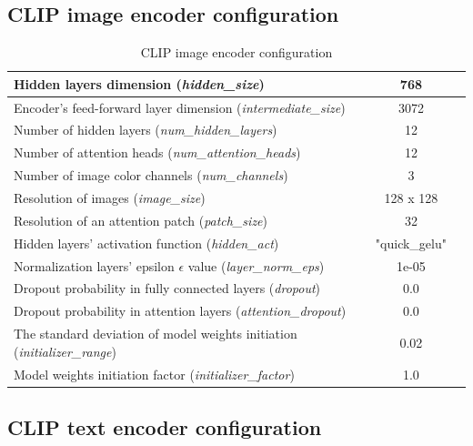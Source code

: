 \documentclass[runningheads]{llncs}
\begin{document}
\subsection{CLIP image encoder configuration}

\begin{table}[H]\footnotesize
  \centering
  \caption{CLIP image encoder configuration}
  {\begin{tabular}{|l|c|c|} 
        \hline
        Hidden layers dimension (\textit{hidden\_size}) & 768 \\
        \hline
        Encoder's feed-forward layer dimension (\textit{intermediate\_size}) & 3072 \\
        \hline
        Number of hidden layers (\textit{num\_hidden\_layers}) & 12 \\
        \hline
        Number of attention heads (\textit{num\_attention\_heads}) & 12 \\
        \hline
        Number of image color channels (\textit{num\_channels}) & 3 \\
        \hline
        Resolution of images (\textit{image\_size}) & 128 x 128 \\
        \hline
        Resolution of an attention patch (\textit{patch\_size}) & 32 \\
        \hline
        Hidden layers' activation function (\textit{hidden\_act}) & "quick\_gelu" \\
        \hline
        Normalization layers' epsilon $\epsilon$ value (\textit{layer\_norm\_eps}) & 1e-05 \\
        \hline
        Dropout probability in fully connected layers
        (\textit{dropout}) & 0.0 \\
        \hline
        Dropout probability in attention layers (\textit{attention\_dropout}) & 0.0 \\
        \hline
        The standard deviation of model weights initiation
        (\textit{initializer\_range}) & 0.02 \\
        \hline
        Model weights initiation factor (\textit{initializer\_factor}) & 1.0 \\
        \hline
  \end{tabular}}
  \label{tab:CLIP vision model config}
\end{table}

\subsection{CLIP text encoder configuration}
\end{document}
